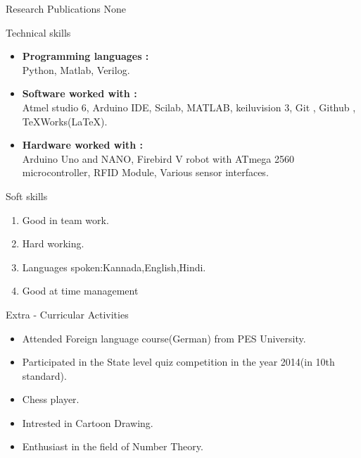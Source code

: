 \documentclass{resume} %
\begin{document}
\begin{rSection}{Research Publications}
None
\end{rSection}

\vspace{1cm}



\begin{rSection}{Technical skills}
\begin{itemize}
    \item {\bf Programming languages :} \\
     Python, Matlab, Verilog.
     \item {\bf Software worked with :} \\
     Atmel studio 6, Arduino IDE, Scilab, MATLAB, keiluvision 3, Git , Github , TeXWorks(LaTeX).
     \item {\bf Hardware worked with :} \\
     Arduino Uno and NANO, Firebird V robot with ATmega 2560 microcontroller, RFID Module, Various sensor interfaces.
     
\end{itemize}
\end{rSection}

\vspace{1cm}


\begin{rSection}{Soft skills}
\begin{enumerate}

	\item Good in team work.
	\item Hard working.
	\item Languages spoken:Kannada,English,Hindi.
	\item Good at time management

\end{enumerate}
\end{rSection}

\vspace{1cm}






\begin{rSection}{Extra - Curricular Activities}
\begin{itemize}
    \item Attended Foreign language course(German) from PES University.
    \item Participated in the State level quiz competition in the year 2014(in 10th standard).
    \item Chess player.
    \item Intrested in Cartoon Drawing.
    \item Enthusiast in the field of Number Theory.
\end{itemize}
\end{rSection}
\end{document}
